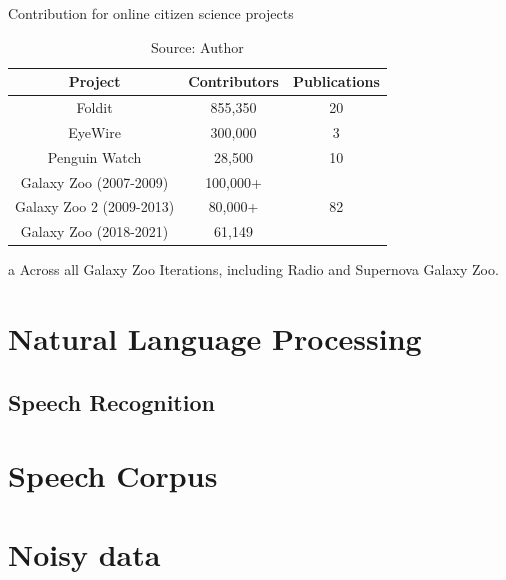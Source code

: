 \begin{table}[h]
\centering
\begin{threeparttable}
    \caption{Contribution for online citizen science projects}
    \small{
    \begin{tabular}{|c|c|c|}
        \hline 
        Project & Contributors & Publications \\ \hline
        Foldit & 855,350 \cite{foldit2021players} & 20 \cite{foldit2021publications} \\ \hline
        EyeWire & 300,000 \cite{eyewire2017players} & 3 \cite{eyewire2021publications} \\ \hline
        Penguin Watch & 28,500 \cite{penguin2021players} & 10 \cite{penguin2021publications} \\ \hline
        Galaxy Zoo (2007-2009) & 100,000+ \cite{lintott2011galaxy} & \multirow{3}{*}{82 \cite{galaxyzoo2021publications}\tnote{~a}} \\ \cline{1-2} 
        Galaxy Zoo 2 (2009-2013) & 80,000+ \cite{galaxyzoo22021volunteers} & \\ \cline{1-2} 
        Galaxy Zoo (2018-2021) & 61,149 \cite{galaxyzoo2021players} & \\ \hline 
    \end{tabular}}
    \begin{tablenotes}
        \item[a] Across all Galaxy Zoo Iterations, including Radio and Supernova Galaxy Zoo.
    \end{tablenotes}
\end{threeparttable}
\caption*{Source: Author}
\label{tab:cs-contributions}
\end{table}

\section{Natural Language Processing}

\subsection{Speech Recognition}

\section{Speech Corpus}

\section{Noisy data}

